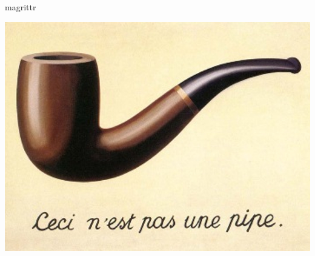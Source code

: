 \documentclass[ignorenonframetext,]{beamer}
\begin{document}
\begin{frame}{magrittr}
\protect\hypertarget{magrittr}{}

\includegraphics{streamlining-with-magrittr.jpg}

\end{frame}
\end{document}
